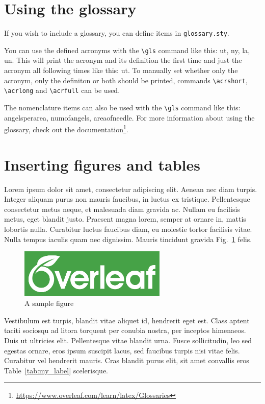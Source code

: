 \section{Using the glossary}
If you wish to include a glossary, you can define items in \texttt{glossary.sty}.

You can use the defined acronyms with the \texttt{\textbackslash gls} command like this: \gls{ut}, \gls{ny}, \gls{la}, \gls{un}. This will print the acronym and its definition the first time and just the acronym all following times like this: \gls{ut}. To manually set whether only the acronym, only the definiton or both should be printed, commands \texttt{\textbackslash acrshort}, \texttt{\textbackslash acrlong} and \texttt{\textbackslash acrfull} can be used.

The nomenclature items can also be used with the \texttt{\textbackslash gls} command like this: \gls{angelsperarea}, \gls{numofangels}, \gls{areaofneedle}. For more information about using the glossary, check out the documentation\footnote{\url{https://www.overleaf.com/learn/latex/Glossaries}}.

\section{Inserting figures and tables}

Lorem ipsum dolor sit amet, consectetur adipiscing elit. Aenean nec diam turpis. Integer aliquam purus non mauris faucibus, in luctus ex tristique. Pellentesque consectetur metus neque, et malesuada diam gravida ac. Nullam eu facilisis metus, eget blandit justo. Praesent magna lorem, semper at ornare in, mattis lobortis nulla. Curabitur luctus faucibus diam, eu molestie tortor facilisis vitae. Nulla tempus iaculis quam nec dignissim. Mauris tincidunt gravida Fig.~\ref{fig:my_label} felis.

\begin{figure}[htp]
    \centering
    \includegraphics[width=7cm]{assets/figures/overleaf_wide_colour_green_bg.png}
    \caption{A sample figure}
    \label{fig:my_label}
\end{figure}

Vestibulum est turpis, blandit vitae aliquet id, hendrerit eget est. Class aptent taciti sociosqu ad litora torquent per conubia nostra, per inceptos himenaeos. Duis ut ultricies elit. Pellentesque vitae blandit urna. Fusce sollicitudin, leo sed egestas ornare, eros ipsum suscipit lacus, sed faucibus turpis nisi vitae felis. Curabitur vel hendrerit mauris. Cras blandit purus elit, sit amet convallis eros Table~\ref{tab:my_label} scelerisque.

